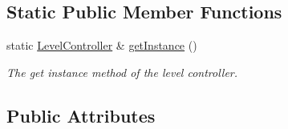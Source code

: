 \subsection*{Static Public Member Functions}
\begin{DoxyCompactItemize}
\item 
static \hyperlink{class_level_controller}{Level\+Controller} \& \hyperlink{class_level_controller_aff1d9aba9f9fb043e644cc4c01869b7f}{get\+Instance} ()
\begin{DoxyCompactList}\small\item\em The get instance method of the level controller. \end{DoxyCompactList}\end{DoxyCompactItemize}
\subsection*{Public Attributes}

